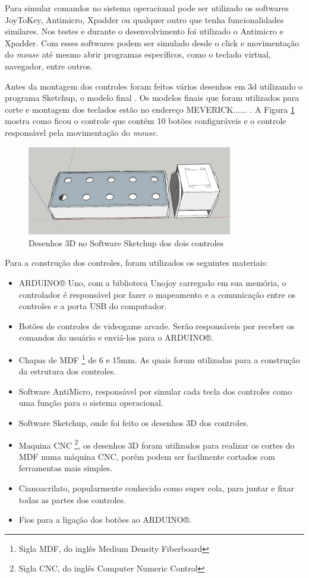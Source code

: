 \documentclass[
	12pt,			%
	openright,		%
	oneside,			%
	a4paper,			%
	chapter=TITLE,		%
	english,			%
	brazil,			%
	]{abntex2}
\begin{document}
Para simular comandos no sistema operacional pode ser utilizado os softwares JoyToKey, Antimicro, Xpadder ou qualquer outro que tenha funcionalidades similares. Nos testes e durante o desenvolvimento foi utilizado o Antimicro e Xpadder. Com esses softwares podem ser simulado desde o click e movimentação do \emph{mouse} até mesmo abrir programas específicos, como o teclado virtual, navegador, entre outros.

Antes da montagem dos controles foram feitos vários desenhos em 3d utilizando o programa Sketchup, o modelo final . Os modelos finais que foram utilizados para corte e montagem dos teclados estão no endereço MEVERICK...... . A Figura \ref{img:img-17} mostra como ficou o controle que contém 10 botões configuráveis e o controle responsável pela movimentação do \emph{mouse}.

\begin{figure}[H]
	\centering
		\includegraphics[width=0.8\textwidth]{./img/img-17.png}
		\caption{Desenhos 3D no Software Sketchup dos dois controles}
		\label{img:img-17}
\end{figure}

Para a construção dos controles, foram utilizados os seguintes materiais:
\begin{itemize}
\item ARDUINO® Uno, com a biblioteca Unojoy carregado em sua memória, o controlador é responsável por fazer o mapeamento e a comunicação entre os controles e a porta USB do computador.
\item Botões de controles de videogame arcade. Serão responsáveis por receber os comandos do usuário e enviá-los para o ARDUINO®.
\item Chapas de MDF \footnote{Sigla MDF, do inglês Medium Density Fiberboard} de 6 e 15mm. As quais foram utilizadas para a construção da estrutura dos controles.
\item Software AntiMicro, responsável por simular cada tecla dos controles como uma função para o sistema operacional.
\item Software Sketchup, onde foi feito os desenhos 3D dos controles.
\item Maquina CNC \footnote{Sigla CNC, do inglês Computer Numeric Control}, os desenhos 3D foram utilizados para realizar os cortes do MDF numa máquina CNC, porém podem ser facilmente cortados com ferramentas mais simples.
\item Cianoacrilato, popularmente conhecido como super cola, para juntar e fixar todas as partes dos controles.
\item Fios para a ligação dos botões ao ARDUINO®.
\end{itemize}
\end{document}

